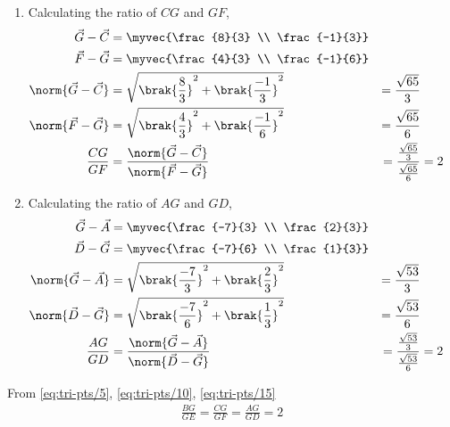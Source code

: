 \documentclass[11pt]{book}
\begin{document}
\begin{enumerate}[label=\thesection.\arabic*.,ref=\thesection.\theenumi]
\begin{enumerate}
\item Calculating the ratio of $CG$ and $GF$,
\begin{align}
		\label{eq:tri-pts/6} \vec{G}-\vec{C} &= \myvec{\frac{8}{3} \\ \frac{-1}{3}} \\
		\label{eq:tri-pts/7} \vec{F}-\vec{G} &= \myvec{\frac{4}{3} \\ \frac{-1}{6}} \\
		\label{eq:tri-pts/8} \norm{\vec{G}-\vec{C}} &= \sqrt{\brak{\frac{8}{3}}^2 + \brak{\frac{-1}{3}}^{2}} &= \frac{\sqrt{65}}{3} \\
		\label{eq:tri-pts/9} \norm{\vec{F}-\vec{G}} &= \sqrt{\brak{\frac{4}{3}}^2 + \brak{\frac{-1}{6}}^2} &= \frac{\sqrt{65}}{6} \\
	  \label{eq:tri-pts/10} \frac{CG}{GF} &= \frac{\norm{\vec{G}-\vec{C}}}{\norm{\vec{F}-\vec{G}}} &= \frac{\frac{\sqrt{65}}{3}}{\frac{\sqrt{65}}{6}} &= 2  
\end{align}		

\item Calculating the ratio of $AG$ and $GD$,
\begin{align}
		\label{eq:tri-pts/11} \vec{G}-\vec{A} &= \myvec{\frac{-7}{3} \\ \frac{2}{3}} \\
		\label{eq:tri-pts/12} \vec{D}-\vec{G} &= \myvec{\frac{-7}{6} \\ \frac{1}{3}} \\
		\label{eq:tri-pts/13} \norm{\vec{G}-\vec{A}} &= \sqrt{\brak{\frac{-7}{3}}^2 + \brak{\frac{2}{3}}^{2}} &= \frac{\sqrt{53}}{3} \\
		\label{eq:tri-pts/14} \norm{\vec{D}-\vec{G}} &= \sqrt{\brak{\frac{-7}{6}}^2 + \brak{\frac{1}{3}}^2} &= \frac{\sqrt{53}}{6} \\
	\label{eq:tri-pts/15} \frac{AG}{GD} &= \frac{\norm{\vec{G}-\vec{A}}}{\norm{\vec{D}-\vec{G}}} &= \frac{\frac{\sqrt{53}}{3}}{\frac{\sqrt{53}}{6}} &= 2  
\end{align}		
\end{enumerate}

From \eqref{eq:tri-pts/5}, \eqref{eq:tri-pts/10}, \eqref{eq:tri-pts/15}
\begin{align}
		\frac{BG}{GE} = 
		\frac{CG}{GF} =
		\frac{AG}{GD} = 2
\end{align}


\end{enumerate}
\end{document}

